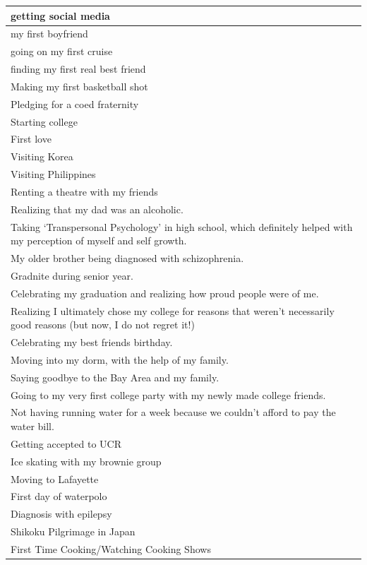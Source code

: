 \documentclass[
  .7em,
  letterpaper,
  DIV=11,
  numbers=noendperiod]{scrartcl}
\begin{document}
\begin{table}
\begin{tabular}{l}
\hline
getting social media\\
\hline
my first boyfriend\\
\hline
going on my first cruise\\
\hline
finding my first real best friend\\
\hline
Making my first basketball shot\\
\hline
Pledging for a coed fraternity\\
\hline
Starting college\\
\hline
First love\\
\hline
Visiting Korea\\
\hline
Visiting Philippines\\
\hline
Renting a theatre with my friends\\
\hline
Realizing that my dad was an alcoholic.\\
\hline
Taking ‘Transpersonal Psychology’ in high school, which definitely helped with my perception of myself and self growth.\\
\hline
My older brother being diagnosed with schizophrenia.\\
\hline
Gradnite during senior year.\\
\hline
Celebrating my graduation and realizing how proud people were of me.\\
\hline
Realizing I ultimately chose my college for reasons that weren’t necessarily good reasons (but now, I do not regret it!)\\
\hline
Celebrating my best friends birthday.\\
\hline
Moving into my dorm, with the help of my family.\\
\hline
Saying goodbye to the Bay Area and my family.\\
\hline
Going to my very first college party with my newly made college friends.\\
\hline
Not having running water for a week because we couldn't afford to pay the water bill.\\
\hline
Getting accepted to UCR\\
\hline
Ice skating with my brownie group\\
\hline
Moving to Lafayette\\
\hline
First day of waterpolo\\
\hline
Diagnosis with epilepsy\\
\hline
Shikoku Pilgrimage in Japan\\
\hline
First Time Cooking/Watching Cooking Shows\\

\end{tabular}
\end{table}
\end{document}
